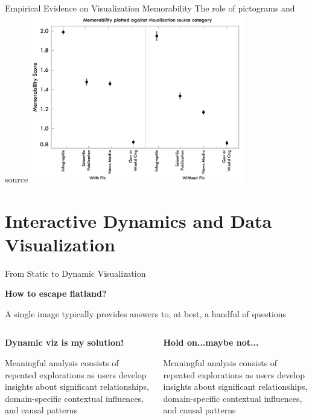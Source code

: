 \documentclass[notes, aspectratio=1610]{beamer}
\begin{document}
\begin{frame}{Empirical Evidence on Visualization Memorability}
	{The role of pictograms and source}
	\centering
	\includegraphics[width=0.7\textwidth]{images/4_4}
\end{frame}

\section{Interactive Dynamics and Data Visualization}

\begin{frame}{From Static to Dynamic Visualization}{}
	\begin{center}
		\textbf{How to escape flatland?}
	\end{center}
	
	A single image typically provides answers to, at best, a handful of 
	questions

	\vspace{2em}

	\pause

\begin{columns}
	\begin{column}{0.5\textwidth}
		\begin{center}
			\textbf{Dynamic viz is my solution!}
		\end{center}

		Meaningful analysis consists of repeated explorations as users
		develop insights about significant relationships,
		domain-specific contextual influences, and causal patterns
	\end{column}

	\pause

	\begin{column}{0.5\textwidth}

		\begin{center}
			\textbf{Hold on...maybe not...}
		\end{center}
		Meaningful analysis consists of repeated explorations as
		users develop insights about significant relationships,
		domain-specific contextual influences, and causal
		patterns
	\end{column}
\end{columns}

\end{frame}
\end{document}
